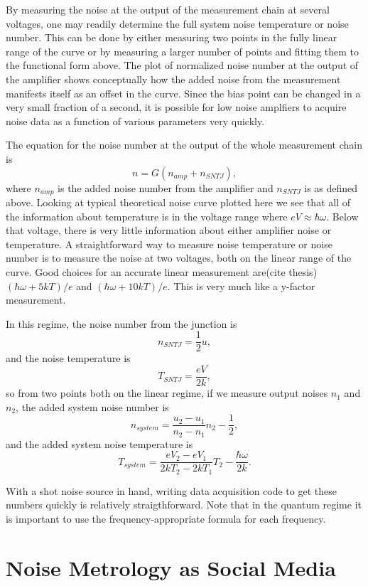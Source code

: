 \documentclass[11pt]{article}
\begin{document}
By measuring the noise at the output of the measurement chain at several voltages, one may readily determine the full system noise temperature or noise number.  This can be done by either measuring two points in the fully linear range of the curve or by measuring a larger number of points and fitting them to the functional form above.  The plot of normalized noise number at the output of the amplifier shows conceptually how the added noise from the measurement manifests itself as an offset in the curve.  Since the bias point can be changed in a very small fraction of a second, it is possible for low noise amplfiers to acquire noise data as a function of various parameters very quickly.  



The equation for the noise number at the output of the whole measurement chain is
$$
n = G(n_{amp} + n_{SNTJ}),
$$
where $n_{amp}$ is the added noise number from the amplifier and $n_{SNTJ}$ is as defined above.  Looking at typical theoretical noise curve plotted here we see that all of the information about temperature is in the voltage range where $eV\approx\hbar\omega$.  Below that voltage, there is very little information about either amplifier noise or temperature.  A straightforward way to measure noise temperature or noise number is to measure the noise at two voltages, both on the linear range of the curve.  Good choices for an accurate linear measurement are(cite thesis) $(\hbar\omega + 5 kT)/e$ and $(\hbar\omega + 10 kT)/e$.  This is very much like a y-factor measurement.  

	In this regime, the noise number from the junction is 
$$
n_{SNTJ} =  \frac{1}{2}u,
$$
and the noise temperature is 
$$
T_{SNTJ} = \frac{eV}{2k},
$$
so from two points both on the linear regime, if we measure output noises $n_1$ and$n_2$, the added system noise number is 
$$
n_{system} = \frac{u_2 -  u_1}{n_2 - n_1}n_2 - \frac{1}{2},
$$
and the added system noise temperature is 
$$
T_{system} = \frac{eV_2 - eV_1}{2kT_2 - 2kT_1}T_2 - \frac{\hbar\omega}{2k}.
$$

	With a shot noise source in hand, writing data acquisition code to get these numbers quickly is relatively straigthforward.  Note that in the quantum regime it is important to use the frequency-appropriate formula for each frequency.  
	

\section{
Noise Metrology as Social Media}
\end{document}
